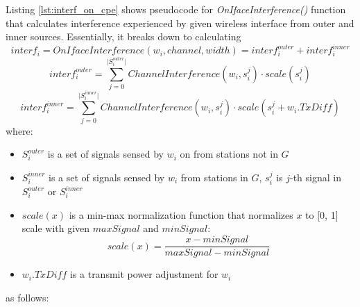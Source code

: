 Listing \ref{lst:interf_on_cpe} shows pseudocode for \textit{OnIfaceInterference()} function that calculates interference experienced by given wireless interface from outer and inner sources.
Essentially, it breaks down to calculating
\begin{equation}
    interf_i = OnIfaceInterference(w_i, channel, width) = interf^{outer}_i + interf^{inner}_i
\end{equation}
\begin{equation}
    interf^{outer}_i = \sum_{j=0}^{\lvert S^{outer}_i \rvert} ChannelInterference(w_i, s^{j}_i) \cdot scale(s^j_i)
\end{equation}
\begin{equation}
    interf^{inner}_i = \sum_{j=0}^{\lvert S^{inner}_i \rvert} ChannelInterference(w_i, s^{j}_i) \cdot scale(s^j_i + w_i.TxDiff)
\end{equation}
where:
\begin{itemize}
    \item $S^{outer}_i$ is a set of signals sensed by $w_i$ on from stations not in $G$
    \item $S^{inner}_i$ is a set of signals sensed by $w_i$ from stations in $G$, $s^j_i$ is $j$-th signal in $S^{outer}_i$ or $S^{inner}_i$
    \item $scale(x)$ is a min-max normalization function that normalizes $x$ to [0, 1] scale with given $maxSignal$ and $minSignal$:
        \begin{equation} scale(x) = \frac{x - minSignal}{maxSignal - minSignal} \end{equation}
    \item $w_i.TxDiff$ is a transmit power adjustment for $w_i$
\end{itemize}
as follows:

